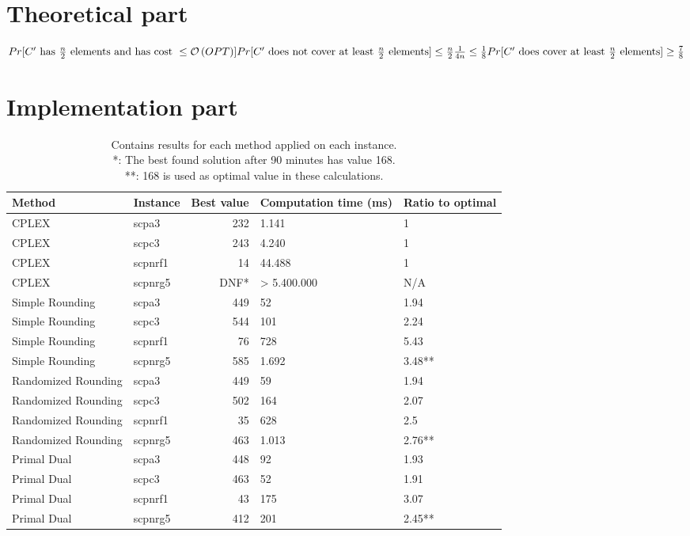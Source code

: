 \section{Theoretical part}
\begin{math}
Pr[C'\text{ has } \frac{n}{2} \text{ elements and has cost } \leq \mathcal{O}\left(OPT\right)]\\
\\
Pr[C' \text{ does not cover at least } \frac{n}{2} \text{ elements}] \leq \frac{n}{2} \frac{1}{4n} \leq \frac{1}{8}\\
\\
Pr[C' \text{ does cover at least } \frac{n}{2} \text{ elements}] \geq \frac{7}{8}
\end{math}

\section{Implementation part}
\begin{table}[H]
	\begin{tabularx}{\linewidth}{|X|l|r|X|X|}
		\hline
		\textbf{Method} & \textbf{Instance} & \textbf{Best value} & \textbf{Computation time (ms)} & \textbf{Ratio to optimal}\\\hline
		CPLEX & scpa3 & 232 & 1.141 & 1\\\hline
		CPLEX & scpc3 & 243 & 4.240 & 1\\\hline
		CPLEX & scpnrf1 & 14 & 44.488 & 1\\\hline
		CPLEX & scpnrg5 & DNF* & > 5.400.000 & N/A\\\hline\hline
		Simple Rounding & scpa3 & 449 & 52 & 1.94\\\hline
		Simple Rounding & scpc3 & 544 & 101 & 2.24\\\hline
		Simple Rounding & scpnrf1 & 76 & 728 & 5.43\\\hline
		Simple Rounding & scpnrg5 & 585 & 1.692 & 3.48**\\\hline\hline
		Randomized Rounding & scpa3 & 449 & 59 & 1.94\\\hline
		Randomized Rounding & scpc3 & 502 & 164 & 2.07\\\hline
		Randomized Rounding & scpnrf1 & 35 & 628 & 2.5\\\hline
		Randomized Rounding & scpnrg5 & 463 & 1.013 & 2.76**\\\hline\hline
		Primal Dual & scpa3 & 448 & 92 & 1.93\\\hline
		Primal Dual & scpc3 & 463 & 52 & 1.91\\\hline
		Primal Dual & scpnrf1 & 43 & 175 & 3.07\\\hline
		Primal Dual & scpnrg5 & 412 & 201 & 2.45**\\\hline
	\end{tabularx}
	\caption{Contains results for each method applied on each instance.\\ *: The best found solution after 90 minutes has value 168.\\ **: 168 is used as optimal value in these calculations.}
\end{table}



